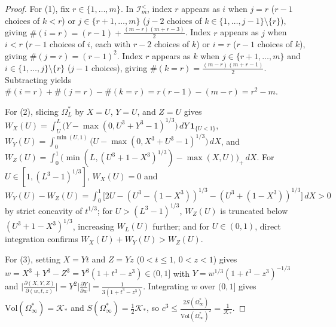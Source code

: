 \documentclass[11pt,a4paper]{article}
\theoremstyle{remark}
\begin{document}
\begin{proof}
For (1), fix $r \in \{1, \dots, m\}$. In $\mathcal{I}_m^{<}$, index $r$ appears as $i$ when $j = r$ ($r - 1$ choices of $k < r$) or $j \in \{r+1, \dots, m\}$ ($j - 2$ choices of $k \in \{1, \dots, j-1\} \setminus \{r\}$), giving $\#(i = r) = (r - 1) + \frac{(m - r)(m + r - 3)}{2}$. Index $r$ appears as $j$ when $i < r$ ($r - 1$ choices of $i$, each with $r - 2$ choices of $k$) or $i = r$ ($r - 1$ choices of $k$), giving $\#(j = r) = (r - 1)^2$. Index $r$ appears as $k$ when $j \in \{r+1, \dots, m\}$ and $i \in \{1, \dots, j\} \setminus \{r\}$ ($j - 1$ choices), giving $\#(k = r) = \frac{(m - r)(m + r - 1)}{2}$. Subtracting yields $\#(i = r) + \#(j = r) - \#(k = r) = r(r - 1) - (m - r) = r^2 - m$.

For (2), slicing $\Omega_L^*$ by $X = U$, $Y = U$, and $Z = U$ gives $W_X(U) = \int_U^L \bigl(Y - \max(0, U^3 + Y^3 - 1)^{1/3}\bigr)\,dY\,\mathbf{1}_{\{U < 1\}}$, $W_Y(U) = \int_0^{\min(U,1)} \bigl(U - \max(0, X^3 + U^3 - 1)^{1/3}\bigr)\,dX$, and $W_Z(U) = \int_0^1 \bigl(\min(L, (U^3 + 1 - X^3)^{1/3}) - \max(X, U)\bigr)_+\,dX$. For $U \in [1, (L^3 - 1)^{1/3}]$, $W_X(U) = 0$ and $W_Y(U) - W_Z(U) = \int_0^1 \bigl[2U - (U^3 - (1 - X^3))^{1/3} - (U^3 + (1 - X^3))^{1/3}\bigr]\,dX > 0$ by strict concavity of $t^{1/3}$; for $U > (L^3 - 1)^{1/3}$, $W_Z(U)$ is truncated below $(U^3 + 1 - X^3)^{1/3}$, increasing $W_L(U)$ further; and for $U \in (0, 1)$, direct integration confirms $W_X(U) + W_Y(U) > W_Z(U)$.

For (3), setting $X = Y t$ and $Z = Y z$ ($0 < t \le 1$, $0 < z < 1$) gives $w = X^3 + Y^3 - Z^3 = Y^3(1 + t^3 - z^3) \in (0, 1]$ with $Y = w^{1/3}(1 + t^3 - z^3)^{-1/3}$ and $\bigl|\frac{\partial(X,Y,Z)}{\partial(w,t,z)}\bigr| = Y^2 \bigl|\frac{\partial Y}{\partial w}\bigr| = \frac{1}{3(1 + t^3 - z^3)}$. Integrating $w$ over $(0, 1]$ gives $\mathrm{Vol}(\Omega_\infty^*) = \mathcal{K}_*$ and $S(\Omega_\infty^*) = \frac{1}{2}\mathcal{K}_*$, so $c^3 \le \frac{2 S(\Omega_\infty^*)}{\mathrm{Vol}(\Omega_\infty^*)^2} = \frac{1}{\mathcal{K}_*}$.
\end{proof}
\end{document}
